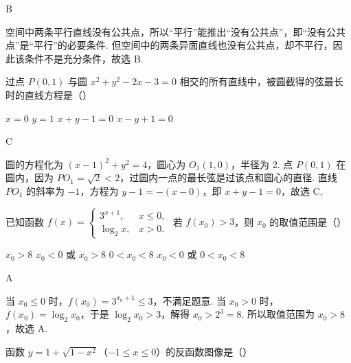 \begin{answer}
B
\end{answer}

\begin{solution}
空间中两条平行直线没有公共点，所以“平行”能推出“没有公共点”，即“没有公共点”是“平行”的必要条件. 但空间中的两条异面直线也没有公共点，却不平行，因此该条件不是充分条件，故选 B.
\end{solution}

\begin{problem}

过点 \( P(0,1) \) 与圆 \( x^{2}+y^{2}-2x-3=0 \) 相交的所有直线中，被圆截得的弦最长时的直线方程是（\quad）

\choices
    {\(x=0\)}
    {\(y=1\)}
    {\(x + y - 1 = 0\)}
    {\(x - y + 1 = 0\)}
\end{problem}

\begin{answer}
C
\end{answer}

\begin{solution}
圆的方程化为 \((x-1)^2+y^2=4\)，圆心为 \(O_1(1,0)\)，半径为 \(2\). 点 \(P(0,1)\) 在圆内，因为 \(PO_1=\sqrt2<2\)，过圆内一点的最长弦是过该点和圆心的直径. 直线 \(PO_1\) 的斜率为 \(-1\)，方程为 \(y-1=-(x-0)\)，即 \(x+y-1=0\)，故选 C.
\end{solution}

\begin{problem}

已知函数 \( f(x)=\begin{cases}
3^{x+1}, & x \leq 0,\\
\log_{2} x, & x > 0.
\end{cases} \) 若 \( f(x_{0})>3 \)，则 \( x_{0} \) 的取值范围是（\quad）

\choices
    {\(x_{0} > 8\)}
    {\(x_{0} < 0\) 或 \(x_{0} > 8\)}
    {\(0 < x_{0} < 8\)}
    {\(x_{0} < 0\) 或 \(0 < x_{0} < 8\)}
\end{problem}

\begin{answer}
A
\end{answer}

\begin{solution}
当 \(x_0\leqslant0\) 时，\(f(x_0)=3^{x_0+1}\leqslant3\)，不满足题意. 当 \(x_0>0\) 时，\(f(x_0)=\log_2x_0\)，于是 \(\log_2x_0>3\)，解得 \(x_0>2^3=8\). 所以取值范围为 \(x_0>8\)，故选 A.
\end{solution}

\begin{problem}

函数 \( y = 1 + \sqrt{1 - x^{2}} \)（\( -1 \leq x \leq 0 \)）的反函数图像是（\quad）

    {}
    {}
    {}
\end{problem}

